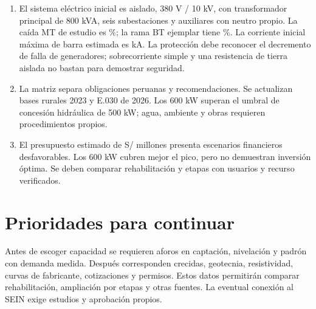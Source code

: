 \begin{enumerate}
\item El sistema eléctrico inicial es aislado, 380 V / 10 kV, con transformador principal de 800 kVA, seis subestaciones y auxiliares con neutro propio. La caída MT de estudio es \%; la rama BT ejemplar tiene \%. La corriente inicial máxima de barra estimada es  kA. La protección debe reconocer el decremento de falla de generadores; sobrecorriente simple y una resistencia de tierra aislada no bastan para demostrar seguridad.
\item La matriz separa obligaciones peruanas y recomendaciones. Se actualizan bases rurales 2023 y E.030 de 2026. Los 600 kW superan el umbral de concesión hidráulica de 500 kW; agua, ambiente y obras requieren procedimientos propios.
\item El presupuesto estimado de S/ millones presenta escenarios financieros desfavorables. Los 600 kW cubren mejor el pico, pero no demuestran inversión óptima. Se deben comparar rehabilitación y etapas con usuarios y recurso verificados.
\end{enumerate}

\section{Prioridades para continuar}
Antes de escoger capacidad se requieren aforos en captación, nivelación y padrón con demanda medida. Después corresponden crecidas, geotecnia, resistividad, curvas de fabricante, cotizaciones y permisos. Estos datos permitirán comparar rehabilitación, ampliación por etapas y otras fuentes. La eventual conexión al SEIN exige estudios y aprobación propios.

